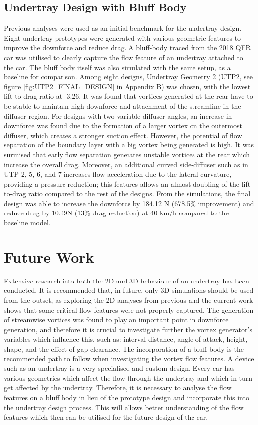 \subsection{Undertray Design with Bluff Body}
Previous analyses were used as an initial benchmark for the undertray design. Eight undertray prototypes were generated with various geometric features to improve the downforce and reduce drag. A bluff-body traced from the 2018 QFR car was utilised to clearly capture the flow feature of an undertray attached to the car. The bluff body itself was also simulated with the same setup, as a baseline for comparison. Among eight designs, Undertray Geometry 2 (UTP2, see figure \ref{fig:UTP2_FINAL_DESIGN} in Appendix B) was chosen, with the lowest lift-to-drag ratio at -3.26. It was found that vortices generated at the rear have to be stable to maintain high downforce and attachment of the streamline in the diffuser region. For designs with two variable diffuser angles, an increase in downforce was found due to the formation of a larger vortex on the outermost diffuser, which creates a stronger suction effect. However, the potential of flow separation of the boundary layer with a big vortex being generated is high. It was surmised that early flow separation generates unstable vortices at the rear which increase the overall drag. Moreover, an additional curved side-diffuser such as in UTP 2, 5, 6, and 7 increases flow acceleration due to the lateral curvature, providing a pressure reduction; this features allows an almost doubling of the lift-to-drag ratio compared to the rest of the designs. From the simulations, the final design was able to increase the downforce by 184.12 N (678.5\% improvement) and reduce drag by 10.49N (13\% drag reduction) at 40 km/h compared to the baseline model.


\section{Future Work}
\noindent Extensive research into both the 2D and 3D behaviour of an undertray has been conducted. It is recommended that, in future, only 3D simulations should be used from the outset, as exploring the 2D analyses from previous and the current work shows that some critical flow features were not properly captured. The generation of streamwise vortices was found to play an important point in downforce generation, and therefore it is crucial to investigate further the vortex generator's variables which influence this, such as: interval distance, angle of attack, height, shape, and the effect of gap clearance. The incorporation of a bluff body is the recommended path to follow when investigating the vortex flow features. A device such as an undertray is a very specialised and custom design. Every car has various geometries which affect the flow through the undertray and which in turn get affected by the undertray. Therefore, it is necessary to analyse the flow features on a bluff body in lieu of the prototype design and incorporate this into the undertray design process. This will allows better understanding of the flow features which then can be utilised for the future design of the car.

